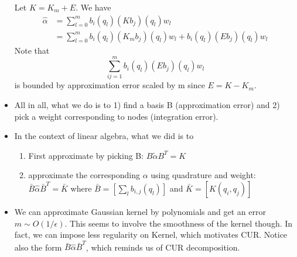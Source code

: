 \documentclass[11pt,reqno]{amsart}
\theoremstyle{remark}
\begin{document}
\begin{sloppypar}
\begin{itemize}
Let $K=K_m+E$. We have
\begin{align*}
\hat\alpha &= \sum\limits^m_{l=0}b_i(q_l)(Kb_j)(q_l)w_l\\
&=\sum\limits^m_{l=0}b_i(q_l)(K_mb_j)(q_l)w_l+b_i(q_l)(Eb_j)(q_l)w_l
\end{align*}
Note that
\[
\sum\limits^m_{ij=1}b_i(q_l)(Eb_j)(q_l)w_l
\]
is bounded by approximation error scaled by m since $E=K-K_m$.
\item All in all, what we do is to 1) find a basis B (approximation error) and 2) pick a 
weight corresponding to nodes (integration error).
\item In the context of linear algebra, what we did is to 
\begin{enumerate}
\item First approximate by picking B: $B\tilde \alpha B^T=K$
\item approximate the corresponding $\alpha$ using quadrature and 
weight: $\bar B\hat \alpha\bar B^T=\bar K$ where 
$\bar B=[\sum_l b_{i,j}(q_l)]$ and $\bar K=[K(q_i,q_j)]$
\end{enumerate}
\item We can approximate Gaussian kernel by polynomials and get an error $m\sim O(1/\epsilon)$. This seems to involve the smoothness of the kernel though. 
In fact, we can impose less regularity on Kernel, which motivates CUR. Notice also the form $\bar B\hat \alpha\bar B^T$, which reminds us of CUR decomposition.
\end{itemize}


\end{sloppypar}
\end{document}
